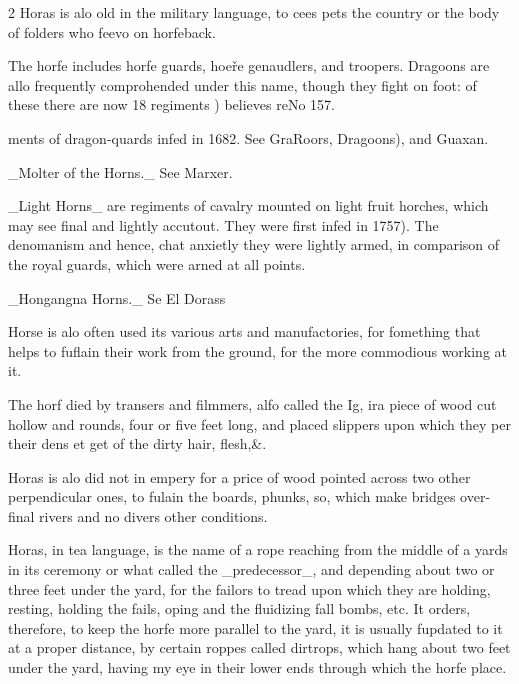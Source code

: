 \documentclass[10pt]{article}
\begin{document}
\begin{multicols}{2}
Horas is alo old in the military language, to cees pets the country or the body of folders who feevo on horfeback.

The horfe includes horfe guards, hoeře genaudlers, and troopers. Dragoons are allo frequently comprohended under this name, though they fight on foot: of these there are now 18 regiments ) believes reNo 157.

ments of dragon-quards infed in 1682. See GraRoors, Dragoons), and Guaxan.

\_Molter of the Horns.\_ See Marxer.

\_Light Horns\_ are regiments of cavalry mounted on light fruit horches, which may see final and lightly accutout. They were first infed in 1757). The denomanism and hence, chat anxietly they were lightly armed, in comparison of the royal guards, which were arned at all points.

\_Hongangna Horns.\_ Se El Dorass

Horse is alo often used its various arts and manufactories, for fomething that helps to fuflain their work from the ground, for the more commodious working at it.

The horf died by transers and filmmers, alfo called the Ig, ira piece of wood cut hollow and rounds, four or five feet long, and placed slippers upon which they per their dens et get of the dirty hair, flesh,\&.

Horas is alo did not in empery for a price of wood pointed across two other perpendicular ones, to fulain the boards, phunks, so, which make bridges over-final rivers and no divers other conditions.

Horas, in tea language, is the name of a rope reaching from the middle of a yards in its ceremony or what called the \_predecessor\_, and depending about two or three feet under the yard, for the failors to tread upon which they are holding, resting, holding the fails, oping and the fluidizing fall bombs, etc. It orders, therefore, to keep the horfe more parallel to the yard, it is usually fupdated to it at a proper distance, by certain roppes called dirtrops, which hang about two feet under the yard, having my eye in their lower ends through which the horfe place.


\end{multicols}
\end{document}
